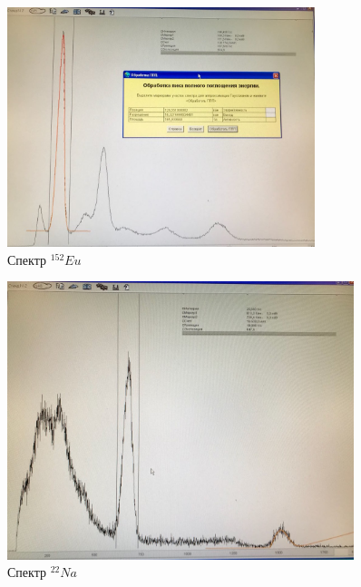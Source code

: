 \documentclass[a4paper,12pt]{article}
\begin{document}
	 \begin{figure}[h!]
	 	\centering
	 	\includegraphics[width=0.8\textwidth]{Eu.jpg}
	 	\caption{Спектр $^{152}Eu$}
	 \end{figure}
	 
	 \begin{figure}[h!]
	 	\centering
	 	\includegraphics[width=0.9\textwidth]{Na.jpg}
	 	\caption{Спектр $^{22}Na$}
	 \end{figure}
	 
	 
\end{document}
